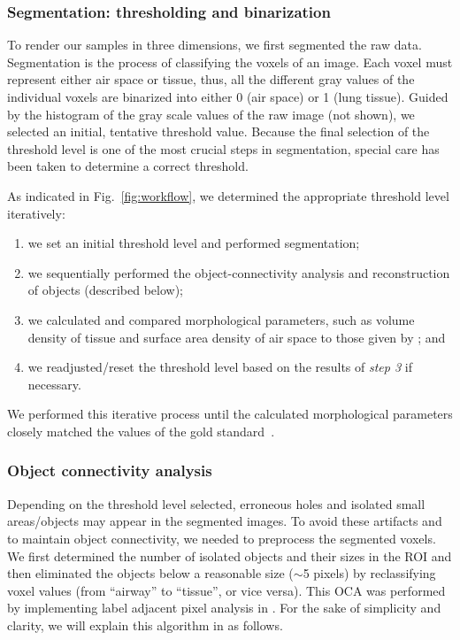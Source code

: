 \subsubsection{Segmentation: thresholding and binarization}
To render our samples in three dimensions, we first segmented the raw data. Segmentation is the process of classifying the voxels of an image. Each voxel must represent either air space or tissue, thus, all the different gray values of the individual voxels are binarized into either 0 (air space) or 1 (lung tissue). Guided by the histogram of the gray scale values of the raw image (not shown), we selected an initial, tentative threshold value. Because the final selection of the threshold level is one of the most crucial steps in segmentation, special care has been taken to determine a correct threshold.

As indicated in Fig.~\ref{fig:workflow}, we determined the appropriate threshold level iteratively: 
\begin{enumerate}
	\item we set an initial threshold level and performed segmentation;
	\item we sequentially performed the object-connectivity analysis and \threed reconstruction of objects (described below);
	\item we calculated and compared morphological parameters, such as volume density of tissue and surface area density of air space to those given by \citet{Tschanz2003}; and
	\item we readjusted/reset the threshold level based on the results of \textit{step 3} if necessary.
\end{enumerate}

We performed this iterative process until the calculated morphological parameters closely matched the values of the gold standard~\cite{Tschanz2003}.

\subsubsection{Object connectivity analysis}
Depending on the threshold level selected, erroneous holes and isolated small areas/objects may appear in the segmented images. To avoid these artifacts and to maintain object connectivity, we needed to preprocess the segmented voxels. We first determined the number of isolated objects and their sizes in the \ac{ROI} and then eliminated the objects below a reasonable size ($\sim$5 pixels) by reclassifying voxel values (from ``airway'' to ``tissue'', or vice versa). This \ac{OCA} was performed by implementing label adjacent pixel analysis in \threed \cite{Ballard1982,Davies1990,Gonzalez1992}. For
the sake of simplicity and clarity, we will explain this algorithm in \twod as follows.

